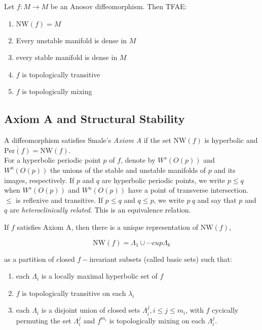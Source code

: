 \begin{thm}

Let $f: M \to M$ be an Anosov diffeomorphism. Then TFAE:

\begin{enumerate}
    \item $\mathrm{NW}(f) = M$
    \item Every unstable manifold is dense in $M$
    \item every stable manifold is dense in $M$
    \item $f$ is topologically transitive
    \item $f$ is topologically mixing
\end{enumerate}
\end{thm}


\subsection{Axiom A and Structural Stability}

A diffeomorphism satisfies Smale's \textit{Axiom A} if the set $\mathrm{NW}(f)$ is hyperbolic and $\overline{\mathrm{Per}(f)} = \mathrm{NW}(f)$. \\
\indent For a hyperbolic periodic point $p$ of $f$, denote by $W^s(O(p))$ and $W^u(O(p))$ the unions of the stable and unstable manifolds of $p$ and its images, respectively. If $p$ and $q$ are hyperbolic periodic points, we write $p \leq q$ when $W^s(O(p))$ and $W^u(O(p))$ have a point of transverse intersection. $\leq$ is reflexive and transitive. If $p \leq q$ and $q \leq p$, we write $p ~ q$ and say that $p$ and $q$ are \textit{heteroclinically related}. This is an equivalence relation. \\

\begin{thm}

If $f$ satisfies Axiom A, then there is a unique representation of $\mathrm{NW}(f)$,

\[\mathrm{NW}(f) = \Lambda_1 \cup \cdots cup \Lambda_k\]

as a partition of closed $f-$invariant subsets (called basic sets) such that: 

\begin{enumerate}
    \item each $\Lambda_i$ is a locally maximal hyperbolic set of $f$
    \item $f$ is topologically transitive on each $\lambda_i$
    \item each $\Lambda_i$ is a disjoint union of closed sets $\Lambda^j_i, i \leq j \leq m_i$, with $f$ cycically permuting the set $\Lambda^j_i$ and $f^{m_i}$ is topologically mixing on each $\Lambda^j_i$.
\end{enumerate}
\end{thm}

